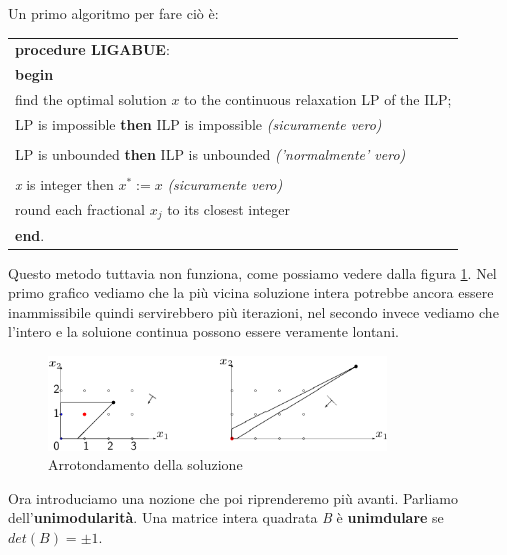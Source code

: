 \documentclass[11pt]{book}
\begin{document}
Un primo algoritmo per fare ci\`o \`e:

\small
\vspace{11pt} 
\begin{center}
\begin{tabular}{||l||}
\hline\hline
{\bf procedure LIGABUE}:\\
{\bf begin}\\
\phantom{aaa}find the optimal solution $x$ to the continuous relaxation LP of the ILP;\\
\phantom{aaa}{\bf if} LP is impossible {\bf then} ILP is impossible
{\em (sicuramente vero)}\\
\phantom{aaa}{\bf else}\\
\phantom{aaaaaa}{\bf if} LP is unbounded {\bf then} ILP is unbounded
        {\em ('normalmente' vero)}\\
\phantom{aaaaaa}{\bf else}\\
\phantom{aaaaaaaaa}{\bf if} {\em x} is integer then $x^* := x$
{\em (sicuramente vero)}\\
\phantom{aaaaaaaaa}{\bf else} round each fractional $x_j$ to its closest integer\\
{\bf end}.\\
\hline\hline
\end{tabular}
\end{center}
\vspace{11pt} 
\normalsize

Questo metodo tuttavia non funziona, come possiamo vedere dalla figura
\ref{ligabue}. Nel primo grafico vediamo che la pi\`u vicina soluzione
intera potrebbe ancora essere inammissibile quindi servirebbero pi\`u
iterazioni, nel secondo invece vediamo che l'intero e la soluione
continua possono essere veramente lontani.

\begin{figure}[h!]
  \centering
  \includegraphics[width=0.8\textwidth]{images/ligabue.png}
  \caption{Arrotondamento della soluzione}
  \label{ligabue}
\end{figure}

Ora introduciamo una nozione che poi riprenderemo pi\`u
avanti. Parliamo dell'{\bf unimodularit\`a}. Una matrice intera
quadrata {\em B} \`e {\bf unimdulare} se $det(B) = \pm  1$.
\end{document}
